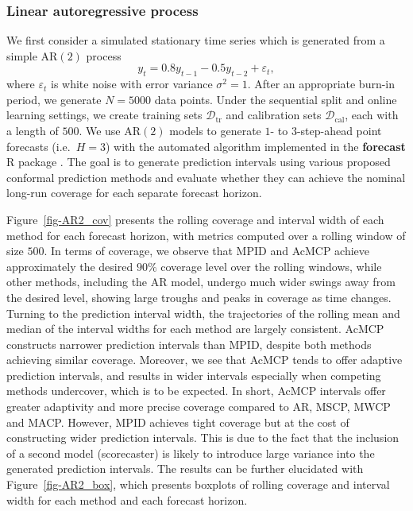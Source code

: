\documentclass[
  11pt,
  a4paper,
]{article}
\theoremstyle{plain}
\theoremstyle{remark}
\begin{document}
\subsubsection{Linear autoregressive
process}\label{linear-autoregressive-process}

We first consider a simulated stationary time series which is generated
from a simple AR\((2)\) process \[
y_t = 0.8y_{t-1} - 0.5y_{t-2} + \varepsilon_t,
\] where \(\varepsilon_t\) is white noise with error variance
\(\sigma^2 = 1\). After an appropriate burn-in period, we generate
\(N=5000\) data points. Under the sequential split and online learning
settings, we create training sets \(\mathcal{D}_{\text{tr}}\) and
calibration sets \(\mathcal{D}_{\text{cal}}\), each with a length of
\(500\). We use AR\((2)\) models to generate \(1\)- to \(3\)-step-ahead
point forecasts (i.e.~\(H=3\)) with the automated algorithm implemented
in the \textbf{forecast} R package \autocite{hyndman2024}. The goal is
to generate prediction intervals using various proposed conformal
prediction methods and evaluate whether they can achieve the nominal
long-run coverage for each separate forecast horizon.

Figure~\ref{fig-AR2_cov} presents the rolling coverage and interval
width of each method for each forecast horizon, with metrics computed
over a rolling window of size \(500\). In terms of coverage, we observe
that MPID and AcMCP achieve approximately the desired \(90\%\) coverage
level over the rolling windows, while other methods, including the AR
model, undergo much wider swings away from the desired level, showing
large troughs and peaks in coverage as time changes. Turning to the
prediction interval width, the trajectories of the rolling mean and
median of the interval widths for each method are largely consistent.
AcMCP constructs narrower prediction intervals than MPID, despite both
methods achieving similar coverage. Moreover, we see that AcMCP tends to
offer adaptive prediction intervals, and results in wider intervals
especially when competing methods undercover, which is to be expected.
In short, AcMCP intervals offer greater adaptivity and more precise
coverage compared to AR, MSCP, MWCP and MACP. However, MPID achieves
tight coverage but at the cost of constructing wider prediction
intervals. This is due to the fact that the inclusion of a second model
(scorecaster) is likely to introduce large variance into the generated
prediction intervals. The results can be further elucidated with
Figure~\ref{fig-AR2_box}, which presents boxplots of rolling coverage
and interval width for each method and each forecast horizon.
\end{document}

